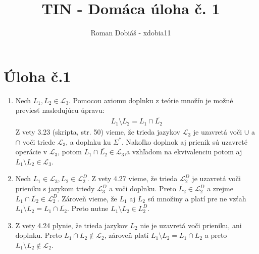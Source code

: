 \documentclass[10pt]{article}
\begin{document}
 
 
 
\title{TIN - Domáca úloha č. 1}%
\author{Roman Dobiáš - xdobia11}
 
\maketitle

\section*{Úloha č.1}
\begin{enumerate}
\item 
    Nech $L_1, L_2 \in \mathcal{L}_3$. 
    Pomocou axiomu doplnku z teórie množín je možné previesť nasledujúcu úpravu:
        \begin{align*}
            L_1 \setminus L_2 = L_1 \cap \overline{L_2}
        \end{align*}
    Z vety 3.23 (skripta, str. 50) vieme, že trieda jazykov $\mathcal{L}_3$ je uzavretá voči
    $\cup$ a $\cap$ voči triede $\mathcal{L}_3$, a doplnku ku $\Sigma^{*}$.
            Nakoľko doplnok aj prienik sú uzavreté operácie v $\mathcal{L}_3$, potom $L_1 \cap
    \overline{L_2} \in \mathcal{L}_3$,a vzhľadom na ekvivalenciu potom aj $L_1 \setminus L_2 \in
    \mathcal{L}_3$. 
\item 
    Nech $L_1 \in \mathcal{L}_3, L_2 \in \mathcal{L}_2^D$. Z vety 4.27 vieme, že trieda
        $\mathcal{L}_2^D$ je uzavretá voči prieniku s jazykom triedy $\mathcal{L}_3^D$ a voči
        doplnku. 
        Preto $\overline{L_2} \in \mathcal{L}_2^D$ a zrejme $L_1 \cap \overline{L_2} \in
        \mathcal{L}_2^D$. Zároveň vieme, že $L_1$ aj $L_2$ sú množiny a platí pre ne vzťah $L_1
        \setminus L_2 = L_1\cap \overline{L_2}$. Preto nutne $L_1\setminus L_2 \in L_2^D$.

\item 
    Z vety 4.24 plynie, že trieda jazykov $L_2$ nie je uzavretá voči prieniku, ani doplnku. Preto
        $L_1 \cap \overline{L_2} \notin \mathcal{L}_2$, zároveň platí $L_1
        \setminus L_2 = L_1\cap \overline{L_2}$ a preto $L_1 \setminus L_2 \notin
        \mathcal{L}_2$.
\end{enumerate}
\end{document}
